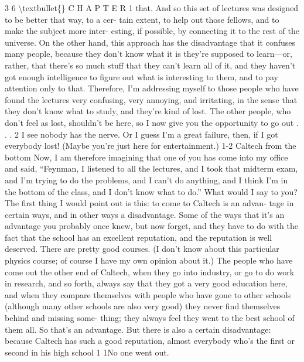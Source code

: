 \documentclass[10pt,oneside]{article}
\begin{document}
3 6 \textbackslash{}textbullet\{\} C H A P T E R  1 that. And so this set of lectures was designed to be better that way, to a cer- tain extent, to help out those fellows, and to make the subject more inter- esting, if possible, by connecting it to the rest of the universe. On the other hand, this approach has the disadvantage that it confuses many people, because they don’t know what it is they’re supposed to learn---or, rather, that there’s so much stuff that they can’t learn all of it, and they haven’t got enough intelligence to figure out what is interesting to them, and to pay attention only to that. Therefore, I’m addressing myself to those people who have found the lectures very confusing, very annoying, and irritating, in the sense that they don’t know what to study, and they’re kind of lost. The other people, who don’t feel as lost, shouldn’t be here, so I now give you the opportunity to go out . . . 2 I see nobody has the nerve. Or I guess I’m a great failure, then, if I got everybody lost! (Maybe you’re just here for entertainment.) 1-2 Caltech from the bottom Now, I am therefore imagining that one of you has come into my office and said, “Feynman, I listened to all the lectures, and I took that midterm exam, and I’m trying to do the problems, and I can’t do anything, and I think I’m in the bottom of the class, and I don’t know what to do.” What would I say to you? The first thing I would point out is this: to come to Caltech is an advan- tage in certain ways, and in other ways a disadvantage. Some of the ways that it’s an advantage you probably once knew, but now forget, and they have to do with the fact that the school has an excellent reputation, and the reputation is well deserved. There are pretty good courses. (I don’t know about this particular physics course; of course I have my own opinion about it.) The people who have come out the other end of Caltech, when they go into industry, or go to do work in research, and so forth, always say that they got a very good education here, and when they compare themselves with people who have gone to other schools (although many other schools are also very good) they never find themselves behind and missing some- thing; they always feel they went to the best school of them all. So that’s an advantage. But there is also a certain disadvantage: because Caltech has such a good reputation, almost everybody who’s the first or second in his high school 1 1No one went out.\par
\end{document}
